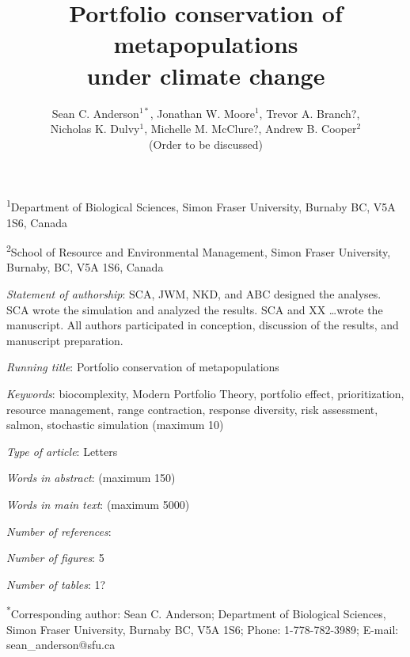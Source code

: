 \documentclass[12pt]{article}
\title{Portfolio conservation of metapopulations\\under climate change}
\author{
  Sean C. Anderson$^{1*}$, 
  Jonathan W. Moore$^1$,
  Trevor A. Branch?,\\
  Nicholas K. Dulvy$^1$,
  Michelle M. McClure?,
  Andrew B. Cooper$^2$\\(Order to be discussed)
}
\date{}
\begin{document}
\begin{spacing}{1.1}
\maketitle

\noindent
  \textsuperscript{1}Department of Biological Sciences, Simon Fraser
  University, Burnaby BC, V5A 1S6, Canada

\noindent
	\textsuperscript{2}School of Resource and Environmental Management, Simon
  Fraser University, Burnaby, BC, V5A 1S6, Canada


\noindent
\textit{Statement of authorship}: SCA, JWM, NKD, and ABC designed the analyses. SCA wrote the simulation and analyzed the results. SCA and XX \ldots wrote the manuscript. All authors participated in conception, discussion of the results, and manuscript preparation.

\noindent
\textit{Running title}:
Portfolio conservation of metapopulations

\noindent
\textit{Keywords}: 
biocomplexity, 
Modern Portfolio Theory, 
portfolio effect, 
prioritization, 
resource management, 
range contraction, 
response diversity, 
risk assessment, 
salmon, 
stochastic simulation 
(maximum 10)

\noindent
\textit{Type of article}: Letters

\noindent
\textit{Words in abstract}: (maximum 150)

\noindent
\textit{Words in main text}: (maximum 5000)

\noindent
\textit{Number of references}:

\noindent
\textit{Number of figures}: 5

\noindent
\textit{Number of tables}: 1?

\noindent
	\textsuperscript{*}Corresponding author: Sean C. Anderson; Department of Biological Sciences, Simon Fraser University, Burnaby BC, V5A 1S6; Phone: 1-778-782-3989; E-mail: sean\_anderson@sfu.ca

\end{spacing}
\clearpage
\end{document}
